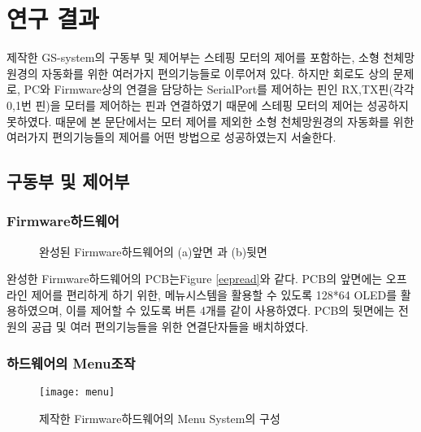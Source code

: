 \section{연구 결과}
 제작한 GS-system의 구동부 및 제어부는 스테핑 모터의 제어를 포함하는, 소형 천체망원경의 자동화를 위한 여러가지 편의기능들로 이루어져 있다. 하지만 회로도 상의 문제로, PC와 Firmware상의 연결을 담당하는 SerialPort를 제어하는 핀인 RX,TX핀(각각 0,1번 핀)을 모터를 제어하는 핀과 연결하였기 때문에 스테핑 모터의 제어는 성공하지 못하였다. 때문에 본 문단에서는 모터 제어를 제외한 소형 천체망원경의 자동화를 위한 여러가지 편의기능들의 제어를 어떤 방법으로 성공하였는지 서술한다.

\subsection{구동부 및 제어부}

\subsubsection{Firmware하드웨어}

	\begin{figure}[ht]
	\begin{center}
	\end{center}
	\caption{완성된 Firmware하드웨어의 (a)앞면 과 (b)뒷면}
	\label{pcb}
	\end{figure}
	
	완성한 Firmware하드웨어의 PCB는\textrm{Figure} \ref{eepread}와 같다. PCB의 앞면에는 오프라인 제어를 편리하게 하기 위한, 메뉴시스템을 활용할 수 있도록 128*64 OLED를 활용하였으며, 이를 제어할 수 있도록 버튼 4개를 같이 사용하였다. PCB의 뒷면에는 전원의 공급 및 여러 편의기능들을 위한 연결단자들을 배치하였다.
 
	
	
\subsubsection{하드웨어의 Menu조작}
 
  \begin{figure}[h]
 	\begin{center}
 		\texttt{[image: menu]}
 	\end{center}
 	\caption{제작한 Firmware하드웨어의 Menu System의 구성}
 	\label{menu}
 \end{figure}
 

